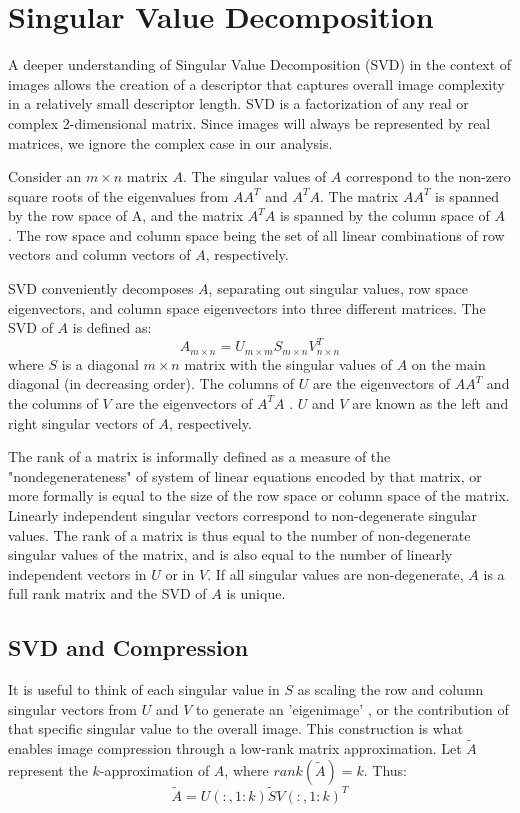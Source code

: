 \documentclass{report}
\begin{document}
\section{Singular Value Decomposition}
\label{sec:SVD}
A deeper understanding of Singular Value Decomposition (SVD) in the context of images allows the creation of a descriptor that captures overall image complexity in a relatively small descriptor length. SVD is a factorization of any real or complex 2-dimensional matrix. Since images will always be represented by real matrices, we ignore the complex case in our analysis. 

Consider an $m \times n$ matrix $A$. The singular values of $A$  correspond to the non-zero square roots of the eigenvalues from $AA^T$ and $A^TA$. The matrix $AA^T$ is spanned by the row space of A, and the matrix $A^TA$ is spanned by the column space of $A$ \cite{using_svd}. The row space and column space being the set of all linear combinations of row vectors and column vectors of $A$, respectively.

SVD conveniently decomposes $A$, separating out singular values, row space eigenvectors, and column space eigenvectors into three different matrices. The SVD of $A$ is defined as:
$$A_{\scriptscriptstyle m \times n} = U_{\scriptscriptstyle m \times m}S_{\scriptscriptstyle m \times n}V_{\scriptscriptstyle n \times n}^T$$
where $S$ is a diagonal $m \times n$ matrix with the singular values of $A$ on the main diagonal (in decreasing order). The columns of $U$ are the eigenvectors of $AA^T$ and the columns of $V$ are the eigenvectors of $A^TA$ \cite{using_svd}. $U$ and $V$ are known as the left and right singular vectors of $A$, respectively.

The rank of a matrix is informally defined as a measure of the "nondegenerateness" of system of linear equations encoded by that matrix, or more formally is equal to the size of the row space or column space of the matrix. Linearly independent singular vectors correspond to non-degenerate singular values.  The rank of a matrix is thus equal to the number of non-degenerate singular values of the matrix, and is also equal to the number of linearly independent vectors in $U$ or in $V$. If all singular values are non-degenerate, $A$ is a full rank matrix and the SVD of $A$ is unique.

\subsection{SVD and Compression}
It is useful to think of each singular value in $S$ as scaling the row and column singular vectors from $U$ and $V$ to generate an 'eigenimage' \cite{svd_image_coding}, or the contribution of that specific singular value to the overall image. This construction is what enables image compression through a low-rank matrix approximation. Let $\tilde{A}$ represent the $k$-approximation of $A$, where $rank(\tilde{A}) = k$. Thus:
$$\tilde{A} = U(:,1:k)\tilde{S}V(:,1:k)^T$$
\end{document}

